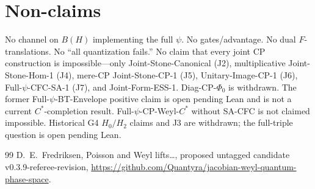 \documentclass[11pt]{article}
\begin{document}
\section{Non-claims}
No channel on \(B(H)\) implementing the full \(\psi\).
No gates/advantage. No dual \(F\)-translations. No ``all quantization fails.''
No claim that every joint CP construction is impossible---only
Joint-Stone-Canonical (J2), multiplicative Joint-Stone-Hom-1 (J4),
mere-CP Joint-Stone-CP-1 (J5),
Unitary-Image-CP-1 (J6), Full-$\psi$-CFC-SA-1 (J7), and Joint-Form-ESS-1.
Diag-CP-\(\Phi_0\) is withdrawn. The former Full-$\psi$-BT-Envelope positive
claim is open pending Lean and is not a current \(C^*\)-completion result.
Full-$\psi$-CP-Weyl-\(C^*\) without SA-CFC is not claimed impossible.
Historical G4 \(H_0/H_2\) claims and J3 are withdrawn; the full-triple
question is open pending Lean.

\begin{thebibliography}{99}
D.~E.~Fredriksen, Poisson and Weyl lifts\ldots, proposed untagged candidate
v0.3.9-referee-revision,
\url{https://github.com/Quantyra/jacobian-weyl-quantum-phase-space}.
\end{thebibliography}
\end{document}
